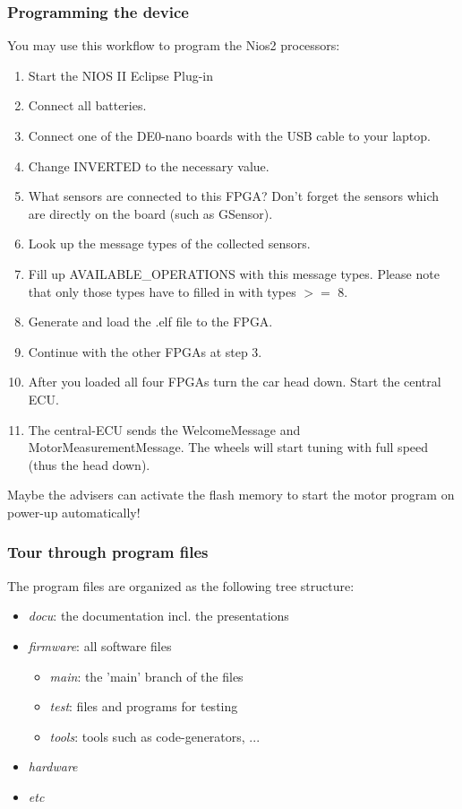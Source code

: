 \subsubsection{Programming the device}
You may use this workflow to program the Nios2 processors:
\begin{enumerate}
	\item Start the NIOS II Eclipse Plug-in
	\item Connect all batteries.
	\item Connect one of the DE0-nano boards with the USB cable to your laptop.
	\item Change INVERTED to the necessary value.
	\item What sensors are connected to this FPGA? Don't forget the sensors which are directly on the board (such as GSensor).
	\item Look up the message types of the collected sensors.
	\item Fill up AVAILABLE\_OPERATIONS with this message types. Please note that only those types have to filled in with types $>=$ 8.
	\item Generate and load the .elf file to the FPGA.
	\item Continue with the other FPGAs at step 3.
	\item After you loaded all four FPGAs turn the car head down. Start the central ECU.
	\item The central-ECU sends the WelcomeMessage and MotorMeasurementMessage. The wheels will start tuning with full speed (thus the head down).\\
\end{enumerate}

Maybe the advisers can activate the flash memory to start the motor program on power-up automatically!

\subsubsection{Tour through program files}

The program files are organized as the following tree structure:
\begin{itemize}
	\item \textit{docu}: the documentation incl. the presentations
	\item \textit{firmware}: all software files
	\begin{itemize}
		\item \textit{main}: the 'main' branch of the files
		\item \textit{test}: files and programs for testing
		\item \textit{tools}: tools such as code-generators, ...
	\end{itemize}
	\item \textit{hardware}
	\item \textit{etc}	\\
\end{itemize}

